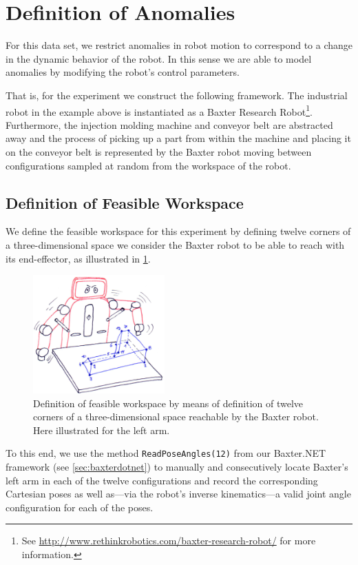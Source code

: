 \documentclass{scrartcl}
\newcommand{\baxterdotnet}{Baxter.NET\xspace}
\begin{document}
\section{Definition of Anomalies}
    For this data set, we restrict anomalies in robot motion to correspond to a change in the dynamic behavior of the robot.
    In this sense we are able to model anomalies by modifying the robot's control parameters.
    
    That is, for the experiment we construct the following framework.
    The industrial robot in the example above is instantiated as a Baxter Research Robot\footnote{See \url{http://www.rethinkrobotics.com/baxter-research-robot/} for more information.}.
    Furthermore, the injection molding machine and conveyor belt are abstracted away and the process of picking up a part from within the machine and placing it on the conveyor belt is represented by the Baxter robot moving between configurations sampled at random from the workspace of the robot.
    
    \subsection{Definition of Feasible Workspace}
    \label{ssec:workspace}
        We define the feasible workspace for this experiment by defining twelve corners of a three-dimensional space we consider the Baxter robot to be able to reach with its end-effector, as illustrated in \cref{fig:baxterws}.
        \begin{figure}
            \centering
            \includegraphics[width=0.45\textwidth]{figs/baxterws}
            \caption{Definition of feasible workspace by means of definition of twelve corners of a three-dimensional space reachable by the Baxter robot.
                Here illustrated for the left arm.}
            \label{fig:baxterws}
        \end{figure}
        To this end, we use the method \verb|ReadPoseAngles(12)| from our \baxterdotnet framework (see \cref{sec:baxterdotnet}) to manually and consecutively locate Baxter's left arm in each of the twelve configurations and record the corresponding Cartesian poses as well as---via the robot's inverse kinematics---a valid joint angle configuration for each of the poses.
        
\end{document}
